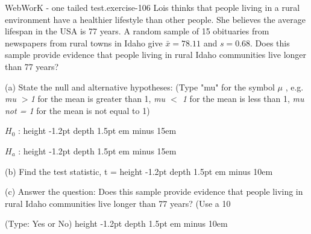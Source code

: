 \documentclass[10pt,]{book}
\newcommand{\fillin}[1]{\leavevmode\leaders\vrule height -1.2pt depth 1.5pt \hskip #1em minus #1em \null}
\numberwithin{equation}{section}
\newcommand{\lt}{<}
\begin{document}
\begin{inlineexercise}{WebWorK - one tailed test.}{exercise-106}%
\hypertarget{p-1503}{}%
Lois thinks that people living in a rural environment have a healthier lifestyle than other people.  She believes the average lifespan in the USA is 77 years. A random sample of 15 obituaries from newspapers from rural towns in Idaho give \(\bar{x} = 78.11\) and \(s = 0.68\).  Does this sample provide evidence that people living in rural Idaho communities live longer than 77 years?%
\par
\hypertarget{p-1504}{}%
(a) State the null and alternative hypotheses:  (Type "mu" for the symbol \(\mu\) , e.g.  \emph{mu \(>\)1} for the mean is greater than 1,  \emph{mu \(\lt \) 1} for the mean is less than 1, \emph{mu not = 1} for the mean is not equal to 1)%
\par
\hypertarget{p-1505}{}%
\(H_0\) :  \fillin{15}%
\par
\hypertarget{p-1506}{}%
\(H_a\) :  \fillin{15}%
\par
\hypertarget{p-1507}{}%
(b) Find the test statistic, t =   \fillin{10}%
\par
\hypertarget{p-1508}{}%
(c) Answer the question: Does this sample provide evidence that people living in rural Idaho communities live longer than 77 years? (Use a 10%
\par
\hypertarget{p-1509}{}%
(Type: Yes or No)  \fillin{10}%
\end{inlineexercise}
%
%
%
\typeout{************************************************}
\typeout{************************************************}
%
\end{document}

